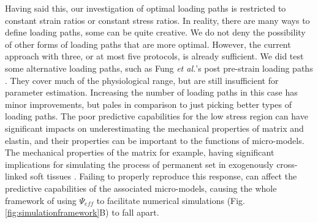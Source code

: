     
    Having said this, our investigation of optimal loading paths is restricted to constant strain ratios or constant stress ratios. In reality, there are many ways to define loading paths, some can be quite creative. We do not deny the possibility of other forms of loading paths that are more optimal. However, the current approach with three, or at most five protocols, is already sufficient. We did test some alternative loading paths, such as Fung \textit{et al.}'s post pre-strain loading paths \cite{fung_pseudoelasticity_1979}. They cover much of the physiological range, but are still insufficient for parameter estimation. Increasing the number of loading paths in this case has minor improvements, but pales in comparison to just picking better types of loading paths. The poor predictive capabilities for the low stress region can have significant impacts on underestimating the mechanical properties of matrix and elastin, and their properties can be important to the functions of micro-models. The mechanical properties of the matrix for example, having significant implications for simulating the process of permanent set in exogenously cross-linked soft tissues \cite{zhang_modeling_2017}. Failing to properly reproduce this response, can affect the predictive capabilities of the associated micro-models, causing the whole framework of using $\Psi_{eff}$ to facilitate numerical simulations (Fig. \ref{fig:simulationframework}B) to fall apart. 
    
    








